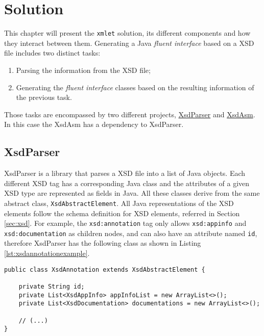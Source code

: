 \chapter{Solution}
\label{cha:solution}

\sloppy

This chapter will present the \texttt{xmlet} solution, its different components and how they interact between them. Generating a Java \textit{fluent interface} based on a \ac{XSD} file includes two distinct tasks:

\begin{enumerate}
\item Parsing the information from the \ac{XSD} file;
\item Generating the \textit{fluent interface} classes based on the resulting information of the previous task.
\end{enumerate}

\noindent
Those tasks are encompassed by two different projects, \hyperref[sec:xsdparser]{XsdParser} and \hyperref[sec:xsdasm]{XsdAsm}. In this case the XsdAsm has a dependency to XsdParser.

\section{XsdParser} %
\label{sec:xsdparser}

XsdParser is a library that parses a \ac{XSD} file into a list of Java objects. Each different \ac{XSD} tag has a corresponding Java class and the  attributes of a given \ac{XSD} type are represented as fields in Java. All these classes derive from the same abstract class, \texttt{XsdAbstractElement}. All Java representations of the \ac{XSD} elements follow the schema definition for \ac{XSD} elements, referred in Section \ref{sec:xsd}. For example, the \texttt{xsd:annotation} tag only allows \texttt{xsd:appinfo} and \texttt{xsd:documentation} as children nodes, and can also have an attribute named \texttt{id}, therefore XsdParser has the following class as shown in Listing \ref{lst:xsdannotationexample}.

\bigskip


\begin{minipage}{\linewidth}
\begin{lstlisting}[caption={XsdAnnotation class (Simplified)}, label={lst:xsdannotationexample}]
public class XsdAnnotation extends XsdAbstractElement {

    private String id;
    private List<XsdAppInfo> appInfoList = new ArrayList<>();
    private List<XsdDocumentation> documentations = new ArrayList<>();
    
    // (...)
}
\end{lstlisting}
\end{minipage}

